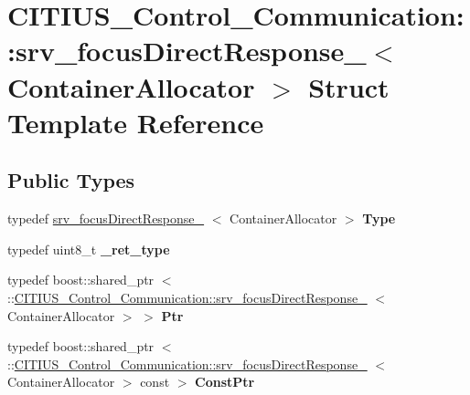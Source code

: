 \hypertarget{struct_c_i_t_i_u_s___control___communication_1_1srv__focus_direct_response__}{\section{\-C\-I\-T\-I\-U\-S\-\_\-\-Control\-\_\-\-Communication\-:\-:srv\-\_\-focus\-Direct\-Response\-\_\-$<$ \-Container\-Allocator $>$ \-Struct \-Template \-Reference}
\label{struct_c_i_t_i_u_s___control___communication_1_1srv__focus_direct_response__}
}
\subsection*{\-Public \-Types}
\begin{DoxyCompactItemize}
\item 
\hypertarget{struct_c_i_t_i_u_s___control___communication_1_1srv__focus_direct_response___a3c981c7d3c34bd3aea675d3f547e6867}{typedef \*
\hyperlink{struct_c_i_t_i_u_s___control___communication_1_1srv__focus_direct_response__}{srv\-\_\-focus\-Direct\-Response\-\_\-}\*
$<$ \-Container\-Allocator $>$ {\bfseries \-Type}}\label{struct_c_i_t_i_u_s___control___communication_1_1srv__focus_direct_response___a3c981c7d3c34bd3aea675d3f547e6867}

\item 
\hypertarget{struct_c_i_t_i_u_s___control___communication_1_1srv__focus_direct_response___ac94e7c1dd702bcd73a2ef5ae147d2532}{typedef uint8\-\_\-t {\bfseries \-\_\-ret\-\_\-type}}\label{struct_c_i_t_i_u_s___control___communication_1_1srv__focus_direct_response___ac94e7c1dd702bcd73a2ef5ae147d2532}

\item 
\hypertarget{struct_c_i_t_i_u_s___control___communication_1_1srv__focus_direct_response___adbcba7e01351eba46522a7d505138e2a}{typedef boost\-::shared\-\_\-ptr\*
$<$ \-::\hyperlink{struct_c_i_t_i_u_s___control___communication_1_1srv__focus_direct_response__}{\-C\-I\-T\-I\-U\-S\-\_\-\-Control\-\_\-\-Communication\-::srv\-\_\-focus\-Direct\-Response\-\_\-}\*
$<$ \-Container\-Allocator $>$ $>$ {\bfseries \-Ptr}}\label{struct_c_i_t_i_u_s___control___communication_1_1srv__focus_direct_response___adbcba7e01351eba46522a7d505138e2a}

\item 
\hypertarget{struct_c_i_t_i_u_s___control___communication_1_1srv__focus_direct_response___aae79c930dcd585f9144f0887392ea037}{typedef boost\-::shared\-\_\-ptr\*
$<$ \-::\hyperlink{struct_c_i_t_i_u_s___control___communication_1_1srv__focus_direct_response__}{\-C\-I\-T\-I\-U\-S\-\_\-\-Control\-\_\-\-Communication\-::srv\-\_\-focus\-Direct\-Response\-\_\-}\*
$<$ \-Container\-Allocator $>$ const  $>$ {\bfseries \-Const\-Ptr}}\label{struct_c_i_t_i_u_s___control___communication_1_1srv__focus_direct_response___aae79c930dcd585f9144f0887392ea037}

\end{DoxyCompactItemize}
